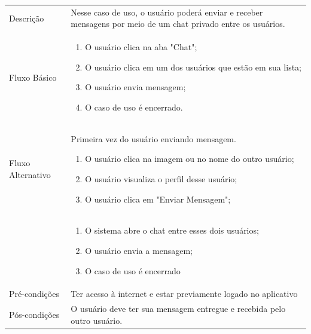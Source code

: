 
\begin{quadro}[htb]
	\centering
	\ABNTEXfontereduzida
	\caption[Caso de Uso Troca de mensagens de texto em chat individual]{Caso de Uso Troca de mensagens de texto em chat individual}
	\label{casos-de-uso15}
\end{quadro}

\begin{longtable}{|p{3.3cm}|p{12.3cm}|}
	\hline
	\thead{} & \thead{Ator} \\
	\hline
	Descrição &Nesse caso de uso, o usuário poderá enviar e receber mensagens por meio de um chat privado entre os usuários.\\
	\hline
	Fluxo Básico  & 
	\begin{enumerate}
		\item O usuário clica na aba "Chat";
		\item O usuário clica em um dos usuários que estão em sua lista;
		\item O usuário envia mensagem;
		\item O caso de uso é encerrado. 
	\end{enumerate}\\
	\hline
	Fluxo Alternativo & 
	Primeira vez do usuário enviando mensagem. 
	\begin{enumerate}
		\item O usuário clica na imagem ou no nome do outro usuário;
		\item O usuário visualiza o perfil desse usuário;
		\item O usuário clica em "Enviar Mensagem";
	\end{enumerate}\\
	\hline
	
	\hline
	&
	\begin{enumerate}
		\item O sistema abre o chat entre esses dois usuários;
		\item O usuário envia a mensagem;
		\item O caso de uso é encerrado 
	\end{enumerate}\\
	\hline
	Pré-condições & Ter acesso à internet e estar previamente logado no aplicativo\\
	\hline
	Pós-condições & O usuário deve ter sua mensagem entregue e recebida pelo outro usuário.\\
	\hline
\end{longtable}

